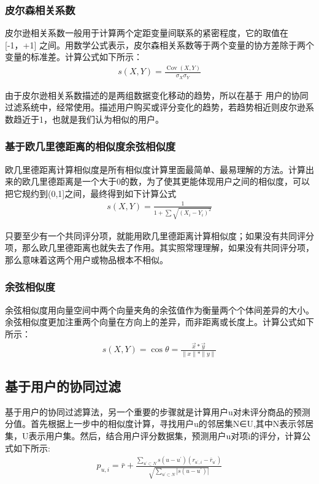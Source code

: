 \documentclass[withoutpreface,bwprint]{cumcmthesis} %
\begin{document}
	\subsubsection{皮尔森相关系数}
	皮尔逊相关系数一般用于计算两个定距变量间联系的紧密程度，它的取值在 [-1，+1] 之间。用数学公式表示，皮尔森相关系数等于两个变量的协方差除于两个变量的标准差。计算公式如下所示：
	\begin{align}
		s(X, Y)=\frac{\operatorname{Cov}(X, Y)}{\sigma_{X} \sigma_{Y}}
	\end{align}
	
	由于皮尔逊相关系数描述的是两组数据变化移动的趋势，所以在基于 用户的协同过滤系统中，经常使用。描述用户购买或评分变化的趋势，若趋势相近则皮尔逊系数趋近于1，也就是我们认为相似的用户。
	\subsubsection{基于欧几里德距离的相似度余弦相似度}
	\par 欧几里德距离计算相似度是所有相似度计算里面最简单、最易理解的方法。计算出来的欧几里德距离是一个大于0的数，为了使其更能体现用户之间的相似度，可以把它规约到(0,1]之间，最终得到如下计算公式
	\begin{align}
		s(X, Y)=\frac{1}{1+\sum \sqrt{\left(X_{i}-Y_{i}\right)^{2}}}
	\end{align}
	\par 只要至少有一个共同评分项，就能用欧几里德距离计算相似度；如果没有共同评分项，那么欧几里德距离也就失去了作用。其实照常理理解，如果没有共同评分项，那么意味着这两个用户或物品根本不相似。
	
	\subsubsection{余弦相似度}
	\par 余弦相似度用向量空间中两个向量夹角的余弦值作为衡量两个个体间差异的大小。余弦相似度更加注重两个向量在方向上的差异，而非距离或长度上。计算公式如下所示：
	\begin{align}
		s(X, Y)=\cos \theta=\frac{\vec{x} * \vec{y}}{\|x\| *\|y\|}
	\end{align}
	
	\subsection{基于用户的协同过滤}
	\par 基于用户的协同过滤算法，另一个重要的步骤就是计算用户u对未评分商品的预测分值。首先根据上一步中的相似度计算，寻找用户u的邻居集N∈U,其中N表示邻居集，U表示用户集。然后，结合用户评分数据集，预测用户u对项i的评分，计算公式如下所示:
	\begin{align}
		p_{u, i}=\bar{r}+\frac{\sum_{u^{\prime} \subset N} s\left(u-u^{\prime}\right)\left(r_{u^{\prime}, i}-\bar{r}_{u^{\prime}}\right)}{\sqrt{\sum_{u^{\prime} \subset N}\left|s\left(u-u^{\prime}\right)\right|}}
	\end{align}
	
\end{document}
